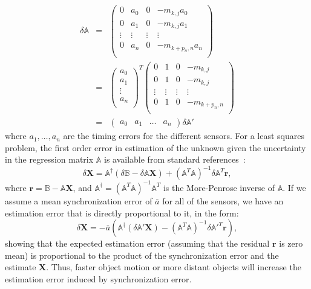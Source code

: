 \begin{eqnarray}
\mathbb{\delta A}&=&\begin{pmatrix}
               0 & a_0 & 0 &-m_{k,j}a_0 \\
               0 & a_1 & 0 & -m_{k,j}a_1 \\
               \vdots & \vdots & \vdots & \vdots \\
               0 & a_n & 0 & -m_{k+p_n,n}a_n \\
             \end{pmatrix}\label{eqn:ALSError}\\
&=&\begin{pmatrix}
               a_0 \\
               a_1 \\
               \vdots \\
               a_n \\
             \end{pmatrix}^T\begin{pmatrix}
               0 & 1 & 0 &-m_{k,j} \\
               0 & 1 & 0 & -m_{k,j} \\
               \vdots & \vdots & \vdots & \vdots \\
               0 & 1 & 0 & -m_{k+p_n,n} \\
             \end{pmatrix}\label{eqn:ALSError1}\\
&=&\begin{pmatrix}
               a_0 &
               a_1 &
               \hdots &
               a_n 
             \end{pmatrix}\delta\mathbb{A'}
\end{eqnarray}
where $a_1,\ldots,a_n$ are the timing errors for the different sensors. For a least squares problem, the first order error in estimation of the unknown given the uncertainty in the regression matrix $\mathbb{A}$ is available from standard references~\cite{BJORK}:
\begin{equation}
\delta \mathbf{X}=\mathbb{A}^\dag\left(\delta \mathbb{B}-\delta\mathbb{A}\mathbf{X}\right)+\left(\mathbb{A}^T\mathbb{A}\right)^{-1}\delta\mathbb{A}^T\mathbf{r},
\end{equation}
where $\mathbf{r}=\mathbb{B}-\mathbb{A}\mathbf{X}$, and $\mathbb{A}^\dag=\left(\mathbb{A}^T\mathbb{A}\right)^{-1}\mathbb{A}^T$ is the More-Penrose inverse of $\mathbb{A}$. If we assume a mean synchronization error of $\bar{a}$ for all of the sensors, we have an estimation error that is directly proportional to it, in the form:
\begin{equation}
\delta \mathbf{X}=-\bar{a}\left(\mathbb{A}^\dag\left(\delta\mathbb{A'}\mathbf{X}\right)-\left(\mathbb{A}^T\mathbb{A}\right)^{-1}\delta\mathbb{A'}^T\mathbf{r}\right),
\end{equation}
 showing that the expected estimation error (assuming that the residual $\mathbf{r}$ is zero mean) is proportional to the product of the synchronization error and the estimate $\mathbf{X}$. Thus, faster object motion or more distant objects will increase the estimation error induced by synchronization error. 